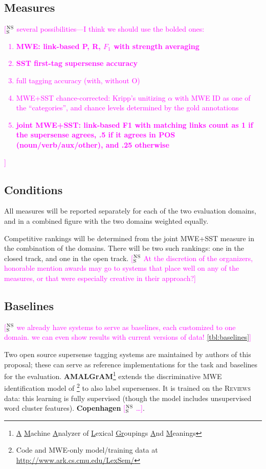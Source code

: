 \documentclass[11pt]{article}
\newcommand{\ensuretext}[1]{#1}
\newcommand{\nssmarker}{\ensuretext{\textcolor{magenta}{\ensuremath{^{\textsc{NS}}_{\textsc{S}}}}}}
\newcommand{\arkcomment}[3]{\ensuretext{\textcolor{#3}{[#1 #2]}}}
\newcommand{\nss}[1]{\arkcomment{\nssmarker}{#1}{magenta}}
\begin{document}
\subsection{Measures}

\nss{several possibilities---I think we should use the bolded ones:
\begin{enumerate}
\item \textbf{MWE: link-based P, R, $F_1$ with strength averaging}
\item \textbf{SST first-tag supersense accuracy}
\item full tagging accuracy (with, without O)
\item MWE+SST chance-corrected: Kripp's unitizing $\alpha$ with MWE ID as one of the ``categories'', and chance levels determined by the gold annotations
\item \textbf{joint MWE+SST: link-based F1 with matching links count as 1 if the supersense agrees, .5 if it agrees in POS (noun/verb/aux/other), and .25 otherwise}
\end{enumerate}
}

\subsection{Conditions}

All measures will be reported separately for each of the two evaluation domains, 
and in a combined figure with the two domains weighted equally. 

Competitive rankings will be determined from the joint MWE+SST measure in the combination of the domains. 
There will be two such rankings: one in the closed track, and one in the open track.
\nss{At the discretion of the organizers, honorable mention awards may go to systems that place well on 
any of the measures, or that were especially creative in their approach?}

\subsection{Baselines}

\nss{we already have systems to serve as baselines, each customized to one domain. 
we can even show results with current versions of data! \cref{tbl:baselines}}

Two open source supersense tagging systems are maintained by authors of this proposal; 
these can serve as reference implementations for the task and baselines for the evaluation. 
\textbf{AMALGrAM}\footnote{\uline{A} \uline{M}achine \uline{A}nalyzer of \uline{L}exical \uline{Gr}oupings \uline{A}nd \uline{M}eanings}
extends the discriminative MWE identification model of \citet{schneider-14}\footnote{Code and MWE-only model/training data at \url{http://www.ark.cs.cmu.edu/LexSem/}} 
to also label supersenses. 
It is trained on the \textsc{Reviews} data: this learning is fully supervised 
(though the model includes unsupervised word cluster features). 
\textbf{Copenhagen} \nss{\ldots}.
\end{document}

